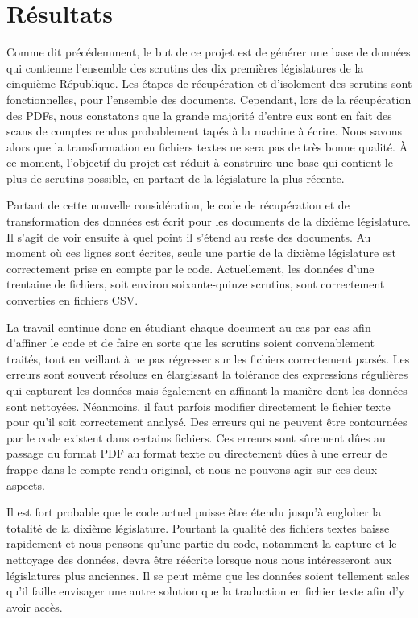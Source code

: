 \section{Résultats}

Comme dit précédemment, le but de ce projet est de générer une base de données qui contienne l'ensemble des scrutins des dix premières législatures de la cinquième République. Les étapes de récupération et d'isolement des scrutins sont fonctionnelles, pour l'ensemble des documents. Cependant, lors de la récupération des PDFs, nous constatons que la grande majorité d'entre eux sont en fait des scans de comptes rendus probablement tapés à la machine à écrire. Nous savons alors que la transformation en fichiers textes ne sera pas de très bonne qualité. À ce moment, l'objectif du projet est réduit à construire une base qui contient le plus de scrutins possible, en partant de la législature la plus récente.

Partant de cette nouvelle considération, le code de récupération et de transformation des données est écrit pour les documents de la dixième législature. Il s'agit de voir ensuite à quel point il s'étend au reste des documents. Au moment où ces lignes sont écrites, seule une partie de la dixième législature est correctement prise en compte par le code. Actuellement, les données d'une trentaine de fichiers, soit environ soixante-quinze scrutins, sont correctement converties en fichiers CSV.

La travail continue donc en étudiant chaque document au cas par cas afin d'affiner le code et de faire en sorte que les scrutins soient convenablement traités, tout en veillant à ne pas régresser sur les fichiers correctement parsés. Les erreurs sont souvent résolues en élargissant la tolérance des expressions régulières qui capturent les données mais également en affinant la manière dont les données sont nettoyées. Néanmoins, il faut parfois modifier directement le fichier texte pour qu'il soit correctement analysé. Des erreurs qui ne peuvent être contournées par le code existent dans certains fichiers. Ces erreurs sont sûrement dûes au passage du format PDF au format texte ou directement dûes à une erreur de frappe dans le compte rendu original, et nous ne pouvons agir sur ces deux aspects.

Il est fort probable que le code actuel puisse être étendu jusqu'à englober la totalité de la dixième législature. Pourtant la qualité des fichiers textes baisse rapidement et nous pensons qu'une partie du code, notamment la capture et le nettoyage des données, devra être réécrite lorsque nous nous intéresseront aux législatures plus anciennes. Il se peut même que les données soient tellement sales qu'il faille envisager une autre solution que la traduction en fichier texte afin d'y avoir accès.
